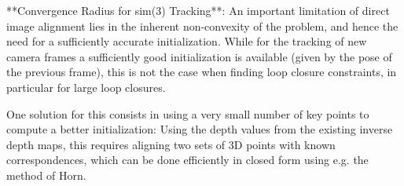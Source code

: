 **Convergence Radius for sim(3) Tracking**: An important limitation of direct
image alignment lies in the inherent non-convexity of the problem, and hence
the need for a sufficiently accurate initialization. While for the tracking of
new camera frames a sufficiently good initialization is available (given by the
pose of the previous frame), this is not the case when finding loop closure
constraints, in particular for large loop closures.

One solution for this consists in using a very small number of key points to
compute a better initialization: Using the depth values from the existing
inverse depth maps, this requires aligning two sets of 3D points with known
correspondences, which can be done efficiently in closed form using e.g. the
method of Horn.
